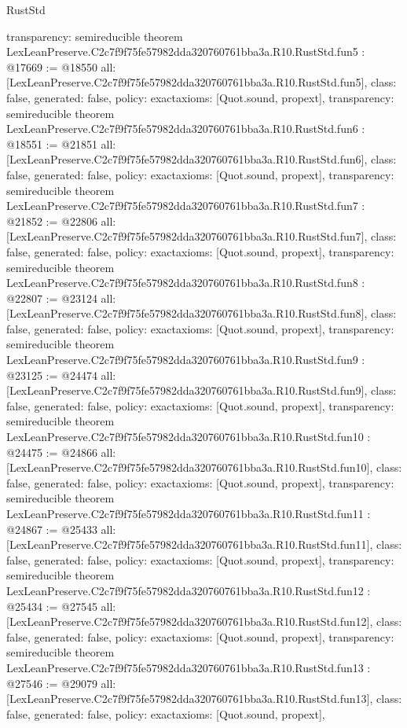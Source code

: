 \begin{lexlean}{RustStd}
\begin{coremodule}
{  transparency: semireducible
}
theorem LexLeanPreserve.C2c7f9f75fe57982dda320760761bba3a.R10.RustStd.fun5 : @17669 := @18550 {
  all: [LexLeanPreserve.C2c7f9f75fe57982dda320760761bba3a.R10.RustStd.fun5],
  class: false,
  generated: false,
  policy: exact{axioms: [Quot.sound, propext]},
  transparency: semireducible
}
theorem LexLeanPreserve.C2c7f9f75fe57982dda320760761bba3a.R10.RustStd.fun6 : @18551 := @21851 {
  all: [LexLeanPreserve.C2c7f9f75fe57982dda320760761bba3a.R10.RustStd.fun6],
  class: false,
  generated: false,
  policy: exact{axioms: [Quot.sound, propext]},
  transparency: semireducible
}
theorem LexLeanPreserve.C2c7f9f75fe57982dda320760761bba3a.R10.RustStd.fun7 : @21852 := @22806 {
  all: [LexLeanPreserve.C2c7f9f75fe57982dda320760761bba3a.R10.RustStd.fun7],
  class: false,
  generated: false,
  policy: exact{axioms: [Quot.sound, propext]},
  transparency: semireducible
}
theorem LexLeanPreserve.C2c7f9f75fe57982dda320760761bba3a.R10.RustStd.fun8 : @22807 := @23124 {
  all: [LexLeanPreserve.C2c7f9f75fe57982dda320760761bba3a.R10.RustStd.fun8],
  class: false,
  generated: false,
  policy: exact{axioms: [Quot.sound, propext]},
  transparency: semireducible
}
theorem LexLeanPreserve.C2c7f9f75fe57982dda320760761bba3a.R10.RustStd.fun9 : @23125 := @24474 {
  all: [LexLeanPreserve.C2c7f9f75fe57982dda320760761bba3a.R10.RustStd.fun9],
  class: false,
  generated: false,
  policy: exact{axioms: [Quot.sound, propext]},
  transparency: semireducible
}
theorem LexLeanPreserve.C2c7f9f75fe57982dda320760761bba3a.R10.RustStd.fun10 : @24475 := @24866 {
  all: [LexLeanPreserve.C2c7f9f75fe57982dda320760761bba3a.R10.RustStd.fun10],
  class: false,
  generated: false,
  policy: exact{axioms: [Quot.sound, propext]},
  transparency: semireducible
}
theorem LexLeanPreserve.C2c7f9f75fe57982dda320760761bba3a.R10.RustStd.fun11 : @24867 := @25433 {
  all: [LexLeanPreserve.C2c7f9f75fe57982dda320760761bba3a.R10.RustStd.fun11],
  class: false,
  generated: false,
  policy: exact{axioms: [Quot.sound, propext]},
  transparency: semireducible
}
theorem LexLeanPreserve.C2c7f9f75fe57982dda320760761bba3a.R10.RustStd.fun12 : @25434 := @27545 {
  all: [LexLeanPreserve.C2c7f9f75fe57982dda320760761bba3a.R10.RustStd.fun12],
  class: false,
  generated: false,
  policy: exact{axioms: [Quot.sound, propext]},
  transparency: semireducible
}
theorem LexLeanPreserve.C2c7f9f75fe57982dda320760761bba3a.R10.RustStd.fun13 : @27546 := @29079 {
  all: [LexLeanPreserve.C2c7f9f75fe57982dda320760761bba3a.R10.RustStd.fun13],
  class: false,
  generated: false,
  policy: exact{axioms: [Quot.sound, propext]},
}
\end{coremodule}
\end{lexlean}

